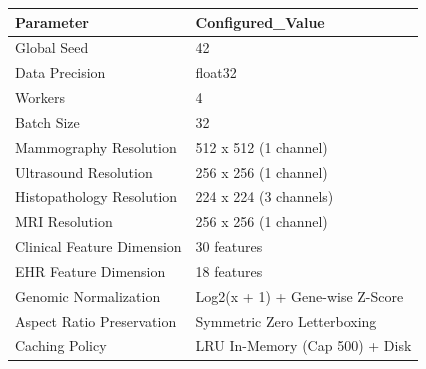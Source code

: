 \begin{tabular}{ll}
\toprule
Parameter & Configured_Value \\
\midrule
Global Seed & 42 \\
Data Precision & float32 \\
Workers & 4 \\
Batch Size & 32 \\
Mammography Resolution & 512 x 512 (1 channel) \\
Ultrasound Resolution & 256 x 256 (1 channel) \\
Histopathology Resolution & 224 x 224 (3 channels) \\
MRI Resolution & 256 x 256 (1 channel) \\
Clinical Feature Dimension & 30 features \\
EHR Feature Dimension & 18 features \\
Genomic Normalization & Log2(x + 1) + Gene-wise Z-Score \\
Aspect Ratio Preservation & Symmetric Zero Letterboxing \\
Caching Policy & LRU In-Memory (Cap 500) + Disk \\
\bottomrule
\end{tabular}
